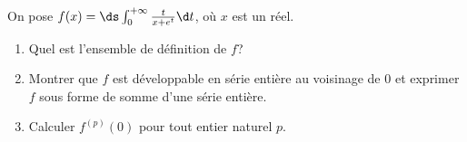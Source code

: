 \begin{enonce}
\begin{exercise}[ID={RMS127 E752},subtitle={Mines-Ponts PSI 2016},tags={}]
  On pose $f(x)=\ds\int_0^{+\infty} \frac{t}{x+e^t} \d t$, où $x$ est un réel.

  \begin{enumerate}
    \item Quel est l'ensemble de définition de $f$?
    \item Montrer que $f$ est développable en série entière au voisinage de $0$ et exprimer $f$ sous forme de somme d'une série entière.
    \item Calculer $f^{(p)}(0)$ pour tout entier naturel $p$.  
  \end{enumerate}
\end{exercise}
\begin{solution}
\end{solution}
\end{enonce}
